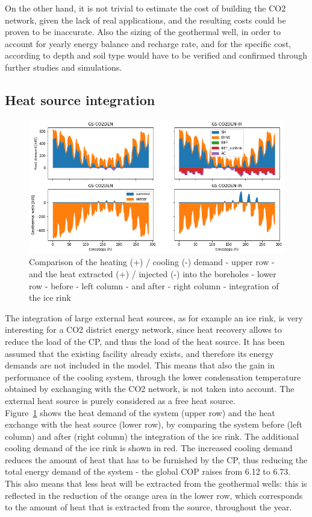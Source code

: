 \documentclass{article}
\begin{document}
On the other hand, it is not trivial to estimate the cost of building the CO2 network, given the lack of real applications, and the resulting costs could be proven to be inaccurate. Also the sizing of the geothermal well, in order to account for yearly energy balance and recharge rate, and for the specific cost, according to depth and soil type would have to be verified and confirmed through further studies and simulations.


\subsection{Heat source integration}

\begin{figure}[thpb]
	\centering
	\includegraphics[width=1\linewidth]{Images/V_IR_Q}
	\caption{Comparison of the heating (+) / cooling (-) demand - upper row - and the heat extracted (+) / injected (-) into the boreholes - lower row - before - left column - and after - right column - integration of the ice rink}
	\label{fig:V_IR_Q}
\end{figure}


The integration of large external heat sources, as for example an ice rink, is very interesting for a CO2 district energy network, since heat recovery allows to reduce the load of the CP, and thus the load of the heat source. It has been assumed that the existing facility already exists, and therefore its energy demands are not included in the model. This means that also the gain in performance of the cooling system, through the lower condensation temperature obtained by exchanging with the CO2 network, is not taken into account. The external heat source is purely considered as a free heat source.\\

Figure~\ref{fig:V_IR_Q} shows the heat demand of the system (upper row) and the heat exchange with the heat source (lower row), by comparing the system before (left column) and after (right column) the integration of the ice rink. The additional cooling demand of the ice rink is shown in red. The increased cooling demand reduces the amount of heat that has to be furnished by the CP, thus reducing the total energy demand of the system - the global COP raises from 6.12 to 6.73. This also means that less heat will be extracted from the geothermal wells: this is reflected in the reduction of the orange area in the lower row, which corresponds to the amount of heat that is extracted from the source, throughout the year.
\end{document}
